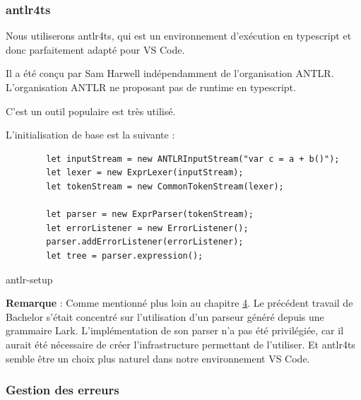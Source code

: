 \documentclass[
    iict, %
    il, %
]{heig-tb}
\begin{document}
\subsubsection{antlr4ts}
Nous utiliserons antlr4ts, qui est un environnement d'exécution en typescript et donc parfaitement adapté pour VS Code.

Il a été conçu par Sam Harwell indépendamment de l'organisation ANTLR.
L'organisation ANTLR ne proposant pas de runtime en typescript. %



C'est un outil populaire est très utilisé.

L'initialisation de base est la suivante :

\begin{listing}[!ht]
    \begin{verbatim}
        let inputStream = new ANTLRInputStream("var c = a + b()");
        let lexer = new ExprLexer(inputStream);
        let tokenStream = new CommonTokenStream(lexer);

        let parser = new ExprParser(tokenStream);
        let errorListener = new ErrorListener();
        parser.addErrorListener(errorListener);
        let tree = parser.expression();
    \end{verbatim}
    \caption{antlr-setup}
    \label{antlr-setup}
\end{listing}


\textbf{Remarque} :
Comme mentionné plus loin au chapitre \hyperref[grammar scope]{4}. Le précédent travail de Bachelor s'était concentré sur l'utilisation d'un parseur généré depuis une grammaire Lark.
L'implémentation de son parser n'a pas été privilégiée, car il aurait été nécessaire de créer l'infrastructure permettant de l'utiliser.
Et antlr4ts semble être un choix plus naturel dans notre environnement VS Code.


\subsubsection{Gestion des erreurs}

\end{document}

